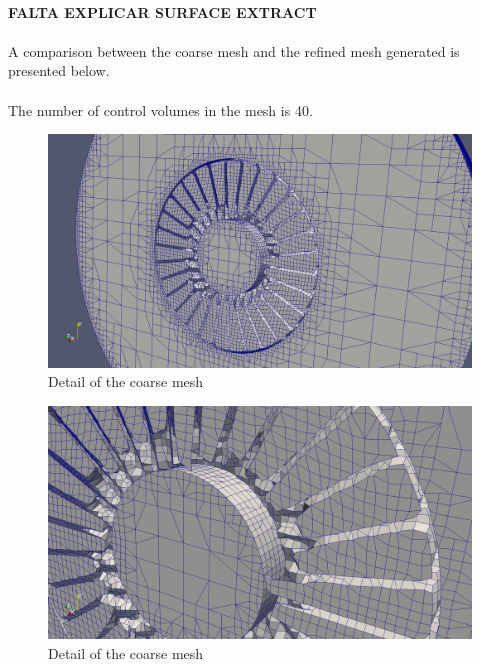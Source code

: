 \paragraph{}\textbf{FALTA EXPLICAR SURFACE EXTRACT}

\paragraph{}A comparison between the coarse mesh and the refined mesh generated is presented below.

\paragraph{}The number of control volumes in the mesh is 40.

\begin{figure}[h!]
\includegraphics[scale=0.26]{./mesh/screenshots/coarse2}
\centering
\caption{Detail of the coarse mesh}
\end{figure}

\begin{figure}[h!]
\includegraphics[scale=0.26]{./mesh/screenshots/coarse3}
\centering
\caption{Detail of the coarse mesh}
\end{figure}

